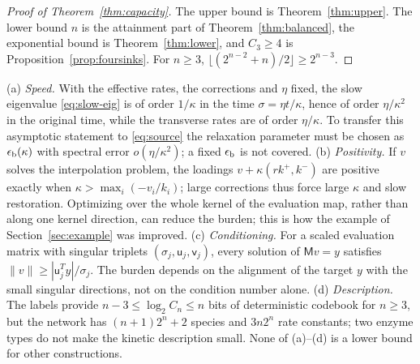 \begin{proof}[Proof of Theorem~\textup{\ref{thm:capacity}}]
The upper bound is Theorem~\ref{thm:upper}. The lower bound \(n\) is the attainment part of
Theorem~\ref{thm:balanced}, the exponential bound is Theorem~\ref{thm:lower}, and \(C_3\ge4\)
is Proposition~\ref{prop:foursinks}. For \(n\ge3\),
\(\lfloor(2^{n-2}+n)/2\rfloor\ge2^{n-3}\).
\end{proof}

\begin{remark}\label{rem:loadingcost}
(a) \emph{Speed.} With the effective rates, the corrections and \(\eta\) fixed, the slow
eigenvalue \eqref{eq:slow-eig} is of order \(1/\kappa\) in the time \(\sigma=\eta t/\kappa\),
hence of order \(\eta/\kappa^2\) in the original time, while the transverse rates are of order
\(\eta/\kappa\). To transfer this asymptotic statement to \eqref{eq:source} the relaxation
parameter must be chosen as \(\epsilon_{\mathrm b}(\kappa)\) with spectral error \(o(\eta/\kappa^2)\); a fixed
\(\epsilon_{\mathrm b}\) is not covered. (b) \emph{Positivity.} If \(v\) solves the interpolation problem, the
loadings \(v+\kappa(rk^+,k^-)\) are positive exactly when \(\kappa>\max_i(-v_i/k_i)\); large
corrections thus force large \(\kappa\) and slow restoration. Optimizing over the whole
kernel of the evaluation map, rather than along one kernel direction, can reduce the burden;
this is how the example of Section~\ref{sec:example} was improved. (c) \emph{Conditioning.} For
a scaled evaluation matrix with singular triplets \((\sigma_j,\mathsf u_j,\mathsf v_j)\), every
solution of \(\mathsf Mv=y\) satisfies \(\|v\|\ge|\mathsf u_j^Ty|/\sigma_j\). The burden
depends on the alignment of the target \(y\) with the small singular directions, not on the
condition number alone. (d) \emph{Description.} The labels provide
\(n-3\le\log_2C_n\le n\) bits of deterministic codebook for \(n\ge3\), but the network has
\((n+1)2^n+2\) species and \(3n2^n\) rate constants; two enzyme types do not make the kinetic
description small. None of (a)--(d) is a lower bound for other constructions.
\end{remark}
